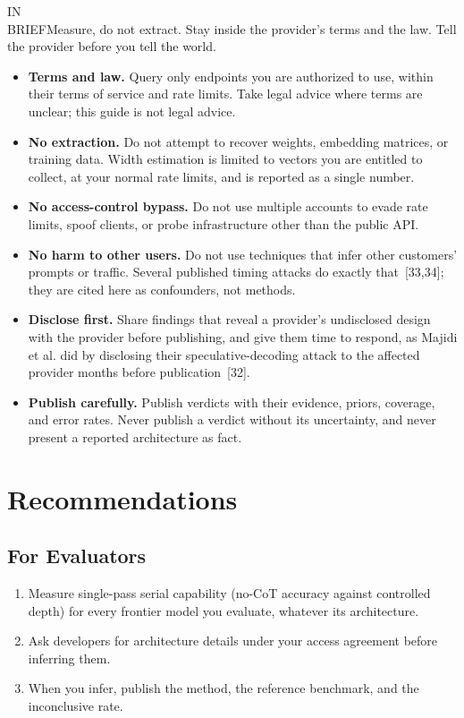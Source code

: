 \documentclass[11pt,letterpaper]{article}
\newcommand{\inbrief}[1]{\begin{inbriefbox}IN\\BRIEF\tcblower #1\end{inbriefbox}}
\begin{document}
\inbrief{Measure, do not extract. Stay inside the provider's terms and the law. Tell the provider before you tell the world.}

\begin{itemize}
  \item \textbf{Terms and law.} Query only endpoints you are authorized to use, within their terms of service and rate limits. Take legal advice where terms are unclear; this guide is not legal advice.
  \item \textbf{No extraction.} Do not attempt to recover weights, embedding matrices, or training data. Width estimation is limited to vectors you are entitled to collect, at your normal rate limits, and is reported as a single number.
  \item \textbf{No access-control bypass.} Do not use multiple accounts to evade rate limits, spoof clients, or probe infrastructure other than the public API.
  \item \textbf{No harm to other users.} Do not use techniques that infer other customers' prompts or traffic. Several published timing attacks do exactly that~[33,34]; they are cited here as confounders, not methods.
  \item \textbf{Disclose first.} Share findings that reveal a provider's undisclosed design with the provider before publishing, and give them time to respond, as Majidi et al. did by disclosing their speculative-decoding attack to the affected provider months before publication~[32].
  \item \textbf{Publish carefully.} Publish verdicts with their evidence, priors, coverage, and error rates. Never publish a verdict without its uncertainty, and never present a reported architecture as fact.
\end{itemize}

\section{Recommendations}
\label{sec:recs}

\subsection{For Evaluators}
\begin{enumerate}
  \item Measure single-pass serial capability (no-CoT accuracy against controlled depth) for every frontier model you evaluate, whatever its architecture.
  \item Ask developers for architecture details under your access agreement before inferring them.
  \item When you infer, publish the method, the reference benchmark, and the inconclusive rate.
\end{enumerate}
\end{document}
